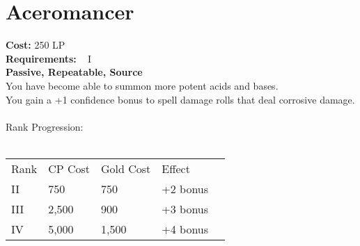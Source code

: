 \section{Aceromancer}\label{perk:aceromancer}
\textbf{Cost:} 250 LP\\
\textbf{Requirements:} ~ I\\
\textbf{Passive, Repeatable, Source}\\
You have become able to summon more potent acids and bases.\\
You gain a +1 confidence bonus to spell damage rolls that deal corrosive damage.\\
\\
Rank Progression:\\
\\
\begin{longtable}{l | l | l | l | l}
    Rank & CP Cost & Gold Cost &  Effect\\
    II & 750 & 750 & +2 bonus\\
    III & 2,500 & 900 & +3 bonus\\
    IV & 5,000 & 1,500 & +4 bonus\\
\end{longtable}